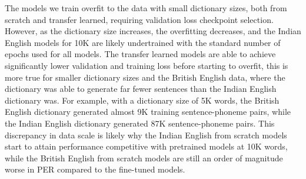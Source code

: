 The models we train overfit to the data with small dictionary sizes, both from scratch and transfer learned, requiring validation loss checkpoint selection.  However, as the dictionary size increases, the overfitting decreases, and the Indian English models for 10K are likely undertrained with the standard number of epochs used for all models. The transfer learned models are able to achieve significantly lower validation and training loss before starting to overfit, this is more true for smaller dictionary sizes and the British English data, where the dictionary was able to generate far fewer sentences than the Indian English dictionary was.  For example, with a dictionary size of 5K words, the British English dictionary generated almost 9K training sentence-phoneme pairs, while the Indian English dictionary generated 87K sentence-phoneme pairs.  This discrepancy in data scale is likely why the Indian English from scratch models start to attain performance competitive with pretrained models at 10K words, while the British English from scratch models are still an order of magnitude worse in PER compared to the fine-tuned models.

